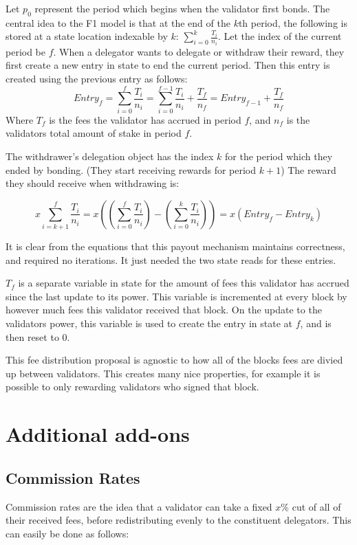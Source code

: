 \documentclass[]{article}
\begin{document}
Let $p_0$ represent the period which begins when the validator first bonds.
The central idea to the F1 model is that at the end of the $k$th period,
the following is stored at a state location indexable by $k$: $\sum_{i=0}^{k}\frac{T_i}{n_i}$.
Let the index of the current period be $f$. 
When a delegator wants to delegate or withdraw their reward, they first create a new entry in state to end the current period.
Then this entry is created using the previous entry as follows:
$$Entry_f = \sum_{i=0}^{f}\frac{T_i}{n_i} = \sum_{i=0}^{f-1}\frac{T_i}{n_i} + \frac{T_f}{n_f} = Entry_{f-1} + \frac{T_f}{n_f}$$
Where $T_f$ is the fees the validator has accrued in period $f$, and $n_f$ is the validators total amount of stake in period $f$.

The withdrawer's delegation object has the index $k$ for the period which they ended by bonding. (They start receiving rewards for period $k + 1$)
The reward they should receive when withdrawing is:

$$x \sum_{i = k + 1}^{f} \frac{T_i}{n_i} = x\left(\left(\sum_{i=0}^{f}\frac{T_i}{n_i}\right) - \left(\sum_{i=0}^{k}\frac{T_i}{n_i}\right)\right) = x\left(Entry_f - Entry_k\right)$$

It is clear from the equations that this payout mechanism maintains correctness, and required no iterations. It just needed the two state reads for these entries.

$T_f$ is a separate variable in state for the amount of fees this validator has accrued since the last update to its power.
This variable is incremented at every block by however much fees this validator received that block.
On the update to the validators power, this variable is used to create the entry in state at $f$, and is then reset to 0.

This fee distribution proposal is agnostic to how all of the blocks fees are divied up between validators.
This creates many nice properties, for example it is possible to only rewarding validators who signed that block.
 
\section{Additional add-ons}
\subsection{Commission Rates}
Commission rates are the idea that a validator can take a fixed $x\%$ cut of all of their received fees, before redistributing evenly to the constituent delegators.
This can easily be done as follows:
\end{document}
